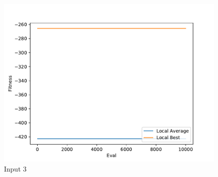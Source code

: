 \documentclass{standalone}
\begin{document}
\begin{figure}[!htb]
	\caption{Input 3}
	\label{fig:graph_3024}
	\includegraphics[width=\textwidth]{../graphs/graphs/3024.pdf}
\end{figure}
\end{document}
